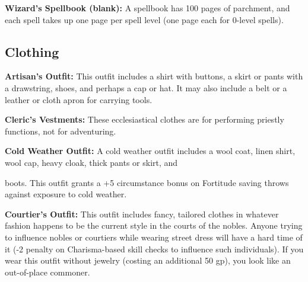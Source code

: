 \textbf{Wizard's Spellbook (blank):} A spellbook has 100 pages of parchment, and 
each spell takes up one page per spell level (one page each for 0-level spells).

\subsection{Clothing}

\textbf{Artisan's Outfit:} This outfit includes a shirt with buttons, a skirt or 
pants with a drawstring, shoes, and perhaps a cap or hat. It may also include a 
belt or a leather or cloth apron for carrying tools.

\textbf{Cleric's Vestments:} These ecclesiastical clothes are for performing priestly 
functions, not for adventuring.

\textbf{Cold Weather Outfit:} A cold weather outfit includes a wool coat, linen 
shirt, wool cap, heavy cloak, thick pants or skirt, and

boots. This outfit grants a +5 circumstance bonus on Fortitude saving throws against 
exposure to cold weather.

\textbf{Courtier's Outfit:} This outfit includes fancy, tailored clothes in whatever 
fashion happens to be the current style in the courts of the nobles. Anyone trying 
to influence nobles or courtiers while wearing street dress will have a hard time 
of it (-2 penalty on Charisma-based skill checks to influence such individuals). 
If you wear this outfit without jewelry (costing an additional 50 gp), you look 
like an out-of-place commoner.

